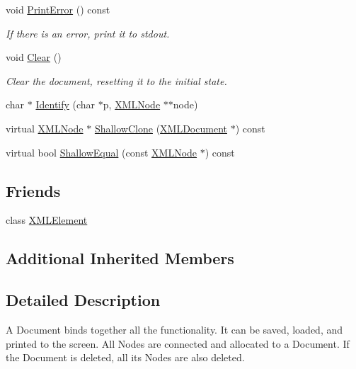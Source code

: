 \begin{DoxyCompactItemize}
void \hyperlink{classtinyxml2_1_1_x_m_l_document_a7545cc9a9a67eee9307c001aa316a388}{Print\+Error} () const 
\begin{DoxyCompactList}\small\item\em If there is an error, print it to stdout. \end{DoxyCompactList}\item 
void \hyperlink{classtinyxml2_1_1_x_m_l_document_a65656b0b2cbc822708eb351504178aaf}{Clear} ()
\begin{DoxyCompactList}\small\item\em Clear the document, resetting it to the initial state. \end{DoxyCompactList}\item 
char $\ast$ \hyperlink{classtinyxml2_1_1_x_m_l_document_a25827d1bec509ad566a107e5853ed040}{Identify} (char $\ast$p, \hyperlink{classtinyxml2_1_1_x_m_l_node}{X\+M\+L\+Node} $\ast$$\ast$node)
\item 
virtual \hyperlink{classtinyxml2_1_1_x_m_l_node}{X\+M\+L\+Node} $\ast$ \hyperlink{classtinyxml2_1_1_x_m_l_document_a57c8511ed9f83aa3e20909a3db3f83d0}{Shallow\+Clone} (\hyperlink{classtinyxml2_1_1_x_m_l_document}{X\+M\+L\+Document} $\ast$) const 
\item 
virtual bool \hyperlink{classtinyxml2_1_1_x_m_l_document_a12eac66c6e45d074d5cc47319868cd66}{Shallow\+Equal} (const \hyperlink{classtinyxml2_1_1_x_m_l_node}{X\+M\+L\+Node} $\ast$) const 
\end{DoxyCompactItemize}
\subsection*{Friends}
\begin{DoxyCompactItemize}
\item 
class \hyperlink{classtinyxml2_1_1_x_m_l_document_ac2fba9b6e452829dd892f7392c24e0eb}{X\+M\+L\+Element}
\end{DoxyCompactItemize}
\subsection*{Additional Inherited Members}


\subsection{Detailed Description}
A Document binds together all the functionality. It can be saved, loaded, and printed to the screen. All Nodes are connected and allocated to a Document. If the Document is deleted, all its Nodes are also deleted. 

